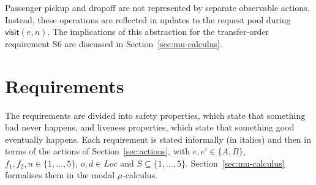 Passenger pickup and dropoff are not represented by separate observable actions. Instead, these operations are reflected in updates to the request pool during \(\mathsf{visit}(e,n)\). The implications of this abstraction for the transfer-order requirement S6 are discussed in Section~\ref{sec:mu-calculus}.

\section{Requirements}
\label{sec:informal-requirements}
\label{sec:action-requirements}

The requirements are divided into safety properties, which state that something bad never happens, and liveness properties, which state that something good eventually happens. Each requirement is stated informally (in italics) and then in terms of the actions of Section~\ref{sec:actions}, with \(e,e'\in\{A,B\}\), \(f_1,f_2,n\in\{1,\ldots,5\}\), \(o,d\in Loc\) and \(S\subseteq\{1,\ldots,5\}\). Section~\ref{sec:mu-calculus} formalises them in the modal \(\mu\)-calculus.

